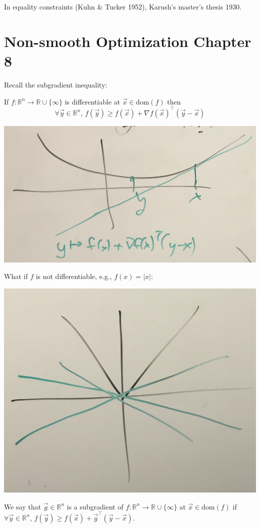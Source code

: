 \documentclass{article}
\newcommand{\R}{\mathbb{R}}
\newcommand{\dom}{\text{dom}}
\begin{document}
In equality constraints (Kuhn \& Tucker 1952), Karush's master's thesis 1930.

\section{Non-smooth Optimization Chapter 8}
Recall the subgradient inequality:

If $f \colon \R^n \to \R \cup \{\infty\}$ is differentiable at $\vec{x} \in \dom(f)$ then
\[
    \forall \vec{y} \in \R^n,\, f(\vec{y}) \geq f(\vec{x}) + \nabla f(\vec{x})^\top(\vec{y} - \vec{x})
\]

\begin{center}
    \includegraphics[scale=0.22]{subgrad_ineq.JPG}
\end{center}

What if $f$ is not differentiable, e.g., $f(x) = |x|$:

\begin{center}
    \includegraphics[scale=0.22]{absolute_x.JPG}
\end{center}

We say that $\vec{g} \in \R^n$ is a subgradient of $f \colon \R^n \to \R \cup \{\infty\}$ at $\vec{x} \in \dom(f)$ if $\forall \vec{y} \in \R^n$, $f(\vec{y}) \geq f(\vec{x}) + \vec{g}^\top(\vec{y} - \vec{x})$.
\end{document}
